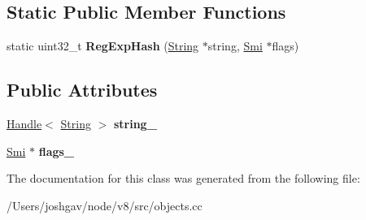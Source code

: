\subsection*{Static Public Member Functions}
\begin{DoxyCompactItemize}
\item 
static uint32\+\_\+t {\bfseries Reg\+Exp\+Hash} (\hyperlink{classv8_1_1internal_1_1_string}{String} $\ast$string, \hyperlink{classv8_1_1internal_1_1_smi}{Smi} $\ast$flags)\hypertarget{classv8_1_1internal_1_1_reg_exp_key_a26dd972766f654f6cac28449ee56ae5b}{}\label{classv8_1_1internal_1_1_reg_exp_key_a26dd972766f654f6cac28449ee56ae5b}

\end{DoxyCompactItemize}
\subsection*{Public Attributes}
\begin{DoxyCompactItemize}
\item 
\hyperlink{classv8_1_1internal_1_1_handle}{Handle}$<$ \hyperlink{classv8_1_1internal_1_1_string}{String} $>$ {\bfseries string\+\_\+}\hypertarget{classv8_1_1internal_1_1_reg_exp_key_ae4407fa7b5a7816859b04ba2bb07930a}{}\label{classv8_1_1internal_1_1_reg_exp_key_ae4407fa7b5a7816859b04ba2bb07930a}

\item 
\hyperlink{classv8_1_1internal_1_1_smi}{Smi} $\ast$ {\bfseries flags\+\_\+}\hypertarget{classv8_1_1internal_1_1_reg_exp_key_a9bf85be3727458685d3f240a91b3668f}{}\label{classv8_1_1internal_1_1_reg_exp_key_a9bf85be3727458685d3f240a91b3668f}

\end{DoxyCompactItemize}


The documentation for this class was generated from the following file\+:\begin{DoxyCompactItemize}
\item 
/\+Users/joshgav/node/v8/src/objects.\+cc\end{DoxyCompactItemize}
